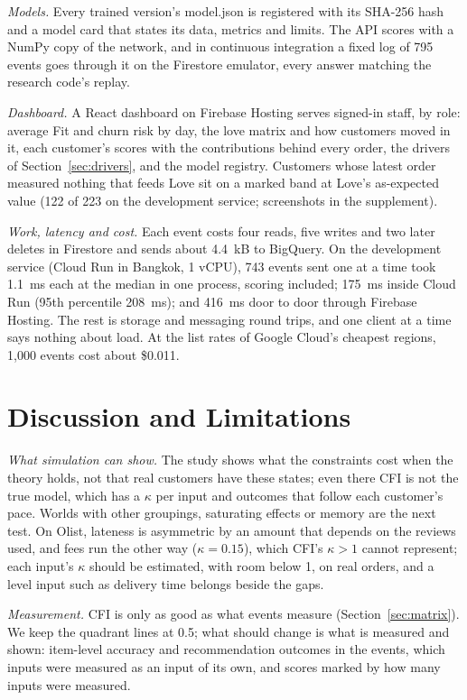 \documentclass[10pt,twocolumn,letterpaper]{article}
\newcommand{\secref}[1]{Section~\mbox{\ref{#1}}}
\newcommand{\runin}[1]{\textit{#1}\hspace{0.4em}}
\begin{document}
\runin{Models.} Every trained version's model.json is registered with its SHA-256 hash and a model card that states its data, metrics and limits. The API scores with a NumPy copy of the network, and in continuous integration a fixed log of 795 events goes through it on the Firestore emulator, every answer matching the research code's replay.

\runin{Dashboard.} A React dashboard on Firebase Hosting serves signed-in staff, by role: average Fit and churn risk by day, the love matrix and how customers moved in it, each customer's scores with the contributions behind every order, the drivers of \secref{sec:drivers}, and the model registry. Customers whose latest order measured nothing that feeds Love sit on a marked band at Love's as-expected value (122 of 223 on the development service; screenshots in the supplement).

\runin{Work, latency and cost.} Each event costs four reads, five writes and two later deletes in Firestore and sends about 4.4~kB to BigQuery. On the development service (Cloud Run in Bangkok, 1 vCPU), 743 events sent one at a time took 1.1~ms each at the median in one process, scoring included; 175~ms inside Cloud Run (95th percentile 208~ms); and 416~ms door to door through Firebase Hosting. The rest is storage and messaging round trips, and one client at a time says nothing about load. At the list rates of Google Cloud's cheapest regions, 1,000 events cost about \$0.011.

\section{Discussion and Limitations}\label{sec:discussion}

\runin{What simulation can show.} The study shows what the constraints cost when the theory holds, not that real customers have these states; even there CFI is not the true model, which has a $\kappa$ per input and outcomes that follow each customer's pace. Worlds with other groupings, saturating effects or memory are the next test. On Olist, lateness is asymmetric by an amount that depends on the reviews used, and fees run the other way ($\kappa = 0.15$), which CFI's $\kappa > 1$ cannot represent; each input's $\kappa$ should be estimated, with room below 1, on real orders, and a level input such as delivery time belongs beside the gaps.

\runin{Measurement.} CFI is only as good as what events measure (\secref{sec:matrix}). We keep the quadrant lines at 0.5; what should change is what is measured and shown: item-level accuracy and recommendation outcomes in the events, which inputs were measured as an input of its own, and scores marked by how many inputs were measured.
\end{document}
